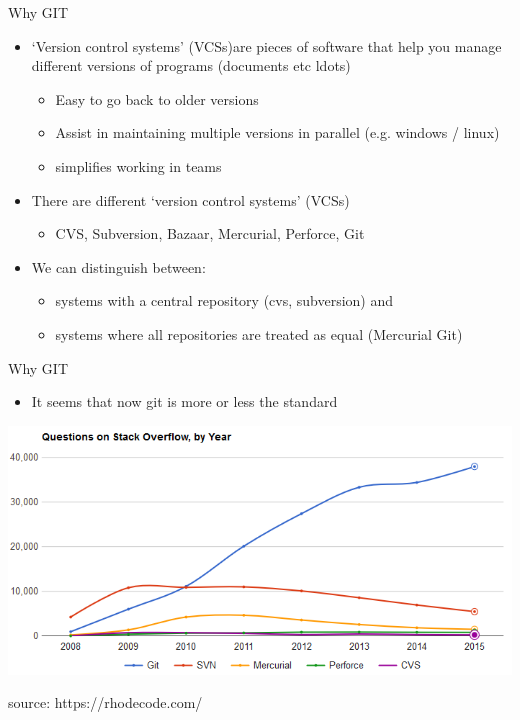 \documentclass[12pt]{beamer}
\begin{document}
\begin{frame}{Why GIT}
	\begin{itemize}
	\item  `Version control systems' (VCSs)are pieces of software that help you manage different versions of programs (documents etc ldots)
	\begin{itemize}
		 \item Easy to go back to older versions
		 \item Assist in maintaining multiple versions in parallel (e.g. windows / linux)
		\item simplifies working in teams
		\end{itemize}
	\item There are different `version control systems' (VCSs)
		\begin{itemize}
		\item CVS, Subversion, Bazaar, Mercurial, Perforce, Git
		\end{itemize}
	\item We can distinguish between:
	\begin{itemize}
		\item systems with a central repository (cvs, subversion) and
		\item systems where all repositories are treated as equal (Mercurial Git)
		\end{itemize}
	  	
	\end{itemize}
	
\end{frame}

\begin{frame}{Why GIT}
	\begin{itemize}	
      \item It seems that now git is more or less the standard	
	\end{itemize}
	\begin{center}
	\includegraphics[width=\linewidth]{NumberOfQuestions}
	\end{center}
	{\tiny source: https://rhodecode.com/}
\end{frame}
\end{document}
